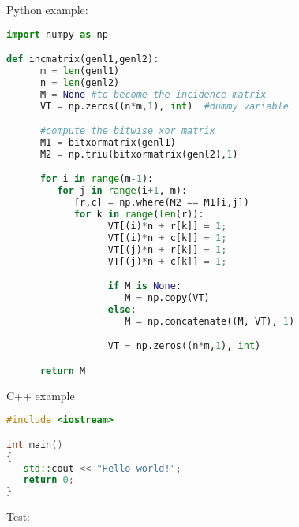 \documentclass[../main.tex]{subfiles}
\begin{document}
Python example:

\begin{lstlisting}[language=Python, caption=Python example]
import numpy as np

def incmatrix(genl1,genl2):
      m = len(genl1)
      n = len(genl2)
      M = None #to become the incidence matrix
      VT = np.zeros((n*m,1), int)  #dummy variable

      #compute the bitwise xor matrix
      M1 = bitxormatrix(genl1)
      M2 = np.triu(bitxormatrix(genl2),1)

      for i in range(m-1):
         for j in range(i+1, m):
            [r,c] = np.where(M2 == M1[i,j])
            for k in range(len(r)):
                  VT[(i)*n + r[k]] = 1;
                  VT[(i)*n + c[k]] = 1;
                  VT[(j)*n + r[k]] = 1;
                  VT[(j)*n + c[k]] = 1;

                  if M is None:
                     M = np.copy(VT)
                  else:
                     M = np.concatenate((M, VT), 1)

                  VT = np.zeros((n*m,1), int)

      return M
\end{lstlisting}

\noindent C++ example

\begin{lstlisting}[language=C++, caption=C++ example]
#include <iostream>

int main()
{
   std::cout << "Hello world!";
   return 0;
}
\end{lstlisting}

Test: 
\end{document}
